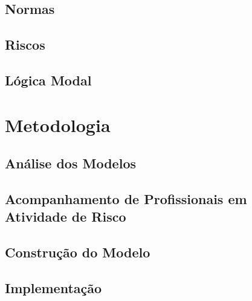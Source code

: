 \documentclass[openright]{normas-utf-tex} %
\begin{document}
		

	\section{Normas} \label{normasdastani}
		


	\section{Riscos} \label{risksec}

				

	\section{Lógica Modal} \label{logic}

		


\chapter{Metodologia}
\label{chap:metod}

	

	\section{Análise dos Modelos}

		

	\section{Acompanhamento de Profissionais em Atividade de Risco}

		

	\section{Construção do Modelo}

		

	\section{Implementação}
\end{document}
